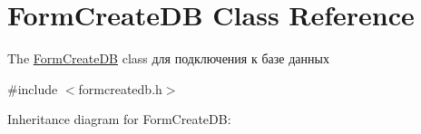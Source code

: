 \hypertarget{classFormCreateDB}{}\section{Form\+Create\+DB Class Reference}
\label{classFormCreateDB}


The \hyperlink{classFormCreateDB}{Form\+Create\+DB} class для подключения к базе данных  




{\ttfamily \#include $<$formcreatedb.\+h$>$}



Inheritance diagram for Form\+Create\+DB\+:

